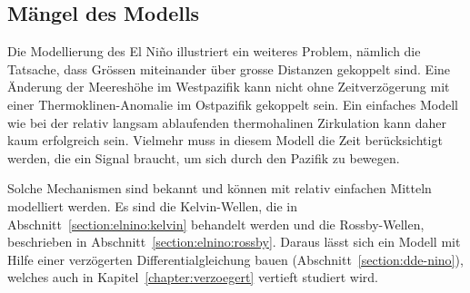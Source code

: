 \subsection{Mängel des Modells\label{subsection:maengel des modells}}
Die Modellierung des El Niño illustriert ein weiteres Problem, nämlich
die Tatsache, dass Grössen miteinander über grosse Distanzen gekoppelt
sind.
Eine Änderung der Meereshöhe im Westpazifik kann nicht ohne Zeitverzögerung
mit einer Thermoklinen-Anomalie im Ostpazifik gekoppelt sein.
Ein einfaches Modell wie bei der relativ langsam ablaufenden thermohalinen
Zirkulation kann daher kaum erfolgreich sein.
Vielmehr muss in diesem Modell die Zeit berücksichtigt werden, die ein
Signal braucht, um sich durch den Pazifik zu bewegen.

Solche Mechanismen sind bekannt und können mit relativ einfachen
Mitteln modelliert werden.
Es sind die Kelvin-Wellen, die in Abschnitt~\ref{section:elnino:kelvin}
behandelt werden und die Rossby-Wellen, beschrieben in
Abschnitt~\ref{section:elnino:rossby}.
Daraus lässt sich ein Modell mit Hilfe einer verzögerten Differentialgleichung
bauen (Abschnitt~\ref{section:dde-nino}), welches auch in
Kapitel~\ref{chapter:verzoegert} vertieft studiert wird.



